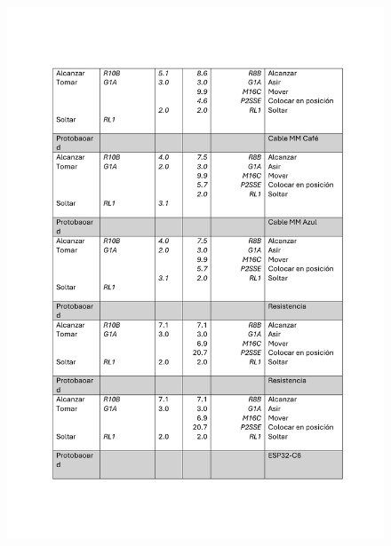     \begin{figure}[H]
        \centering
        \includegraphics[trim = {40mm 60mm 20mm 21mm},clip,scale=0.35]{9/Img/tablaMtmDos.pdf}
        \label{fig:MtmDos}
    \end{figure}
